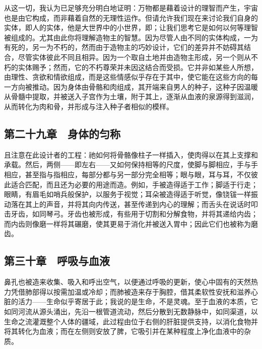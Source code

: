 从这一切，我认为已足够充分明白地证明：万物都是藉着设计的理智而产生，宇宙也是由它构成，而非藉着自然的无理性运作。但请允许我们现在来讨论我们自身的实体，即人的实体，他是大世界中的小世界，即；让我们思考它是如何以何等理智被组成的。尤其由此你将理解造物主的智慧。因为尽管人由不同的实体构成，一为有死的，另一为不朽的，然而由于造物主的巧妙设计，它们的差异并不妨碍其结合，尽管实体彼此不同且相异。因为一个取自土地并由造物主形成，另一个则从不朽的实体赐予；然而，它的不朽尊荣并未因这结合而受损。它并非如某些人所想，由理性、贪欲和情欲组成，而是这些情感似乎存在于其中，使它能在这些方向的每一方向被推动。因为身体由骨骼和肉组成，其开端来自男人的种子，这种子因温暖从骨髓中提取，并被送入子宫作为土壤，附于其上，逐渐从血液的泉源得到滋润，从而转化为肉和骨，并形成与注入种子者相似的模样。\par


\subsection{第二十九章　身体的匀称}

且注意在此设计者的工程：祂如何将骨骼像柱子一样插入，使肉得以在其上支撑和承载。然后，两侧——即左右——又如何保持相等的尺度，使脚与脚相应，手与手相应，甚至指与指相应，每部分都与另一部分完全相等；眼与眼，耳与耳，不仅彼此适合匹配，而且还为必要的用途而造。例如，手被造得适于工作；脚适于行走；眼睛，有眉毛如哨兵般保护，以服务于视觉；耳朵被造得适于听觉，像铙钹一样振动落在其上的声音，并将其向内传送，甚至传递到内心的理解；而舌头在说话时叩击牙齿，如同琴弓。牙齿也被形成，有些用于切割和分解食物，并将其递给内齿；而内齿则像磨一样将其碾磨，使其更易于消化并被送入胃中；因此它们也被称为磨齿。\par


\subsection{第三十章　呼吸与血液}

鼻孔也被造来收集、吸入和呼出空气，以便通过呼吸的更新，使心中固有的天然热力凭借肺部得以按需加温或冷却；而肺被造来存于胸腔，借其柔软性安抚和滋养心脏的活力——生命似乎寄居于此；我说的是生命，不是灵魂。至于血液的本质，它如同河流从源头涌出，先沿一根管道流动，然后分散到无数静脉中，如同渠道，以生命之流灌溉整个人体的疆域，此过程由位于右侧的肝脏提供支持，以消化食物并将其转化为血液；而在左侧则安放了脾，它吸引并在某种程度上净化血液中的杂质。\par

